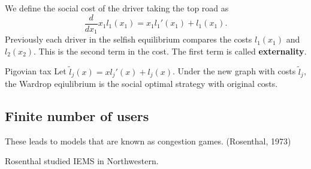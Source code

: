 We define the social cost of the driver taking the top road as \[
\frac{d}{dx_1}x_1l_1(x_1)= x_1l_1'(x_1)+l_1(x_1).
\]
Previously each driver in the selfish equilibrium compares the costs $l_1(x_1)$ and $l_2(x_2)$. This is the second term in the cost. The first term is called \textbf{externality}.
\begin{atheorem}{Pigovian tax}{}
    Let $\tilde{l}_j(x)=xl_j'(x)+l_j(x)$. Under the new graph with costs $\tilde{l}_j$, the Wardrop eqiulibrium is the social optimal strategy with original costs.
\end{atheorem}

\subsection*{Finite number of users}
These leads to models that are known as congestion games. (Rosenthal, 1973)
\begin{remark}
    Rosenthal studied IEMS in Northwestern.
\end{remark}
